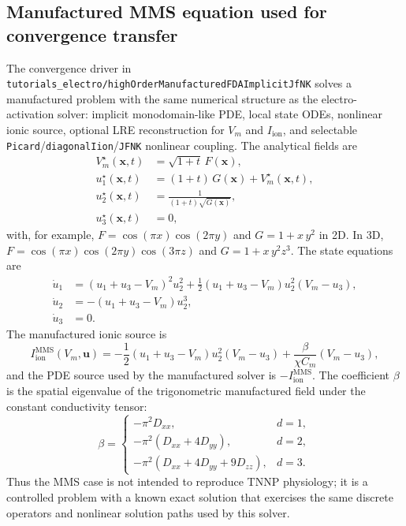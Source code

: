 \documentclass[11pt,a4paper]{article}
\newcommand{\Vm}{V_{m}}
\newcommand{\Iion}{I_{\text{ion}}}
\newcommand{\code}[1]{\texttt{\small #1}}
\begin{document}
\subsection{Manufactured MMS equation used for convergence transfer}

The convergence driver in
\code{tutorials\_electro/highOrderManufacturedFDAImplicitJfNK} solves a
manufactured problem with the same numerical structure as the
electro-activation solver: implicit monodomain-like PDE, local state
ODEs, nonlinear ionic source, optional LRE reconstruction for $\Vm$ and
$\Iion$, and selectable \code{Picard}/\code{diagonalIion}/\code{JFNK}
nonlinear coupling. The analytical fields are
\begin{align}
  \Vm^{\star}(\mathbf{x},t) &= \sqrt{1+t}\,F(\mathbf{x}),\\
  u_1^{\star}(\mathbf{x},t) &= (1+t)\,G(\mathbf{x})+\Vm^{\star}(\mathbf{x},t),\\
  u_2^{\star}(\mathbf{x},t) &=
      \frac{1}{(1+t)\sqrt{G(\mathbf{x})}},\\
  u_3^{\star}(\mathbf{x},t) &= 0,
\end{align}
with, for example,
$F=\cos(\pi x)\cos(2\pi y)$ and $G=1+x\,y^2$ in 2D. In 3D,
$F=\cos(\pi x)\cos(2\pi y)\cos(3\pi z)$ and
$G=1+x\,y^2 z^3$. The state equations are
\begin{align}
  \dot u_1 &=
      (u_1+u_3-\Vm)^2 u_2^2
    + \frac{1}{2}(u_1+u_3-\Vm)u_2^2(\Vm-u_3),\\
  \dot u_2 &= -(u_1+u_3-\Vm)u_2^3,\\
  \dot u_3 &= 0.
\end{align}
The manufactured ionic source is
\begin{equation}
  \Iion^{\mathrm{MMS}}(\Vm,\mathbf{u})
  =
  -\frac{1}{2}(u_1+u_3-\Vm)u_2^2(\Vm-u_3)
  + \frac{\beta}{\chi C_m}(\Vm-u_3),
\end{equation}
and the PDE source used by the manufactured solver is
$-\Iion^{\mathrm{MMS}}$. The coefficient $\beta$ is the spatial
eigenvalue of the trigonometric manufactured field under the constant
conductivity tensor:
\[
  \beta =
  \begin{cases}
    -\pi^2 D_{xx}, & d=1,\\
    -\pi^2(D_{xx}+4D_{yy}), & d=2,\\
    -\pi^2(D_{xx}+4D_{yy}+9D_{zz}), & d=3.
  \end{cases}
\]
Thus the MMS case is not intended to reproduce TNNP physiology; it is a
controlled problem with a known exact solution that exercises the same
discrete operators and nonlinear solution paths used by this solver.
\end{document}
